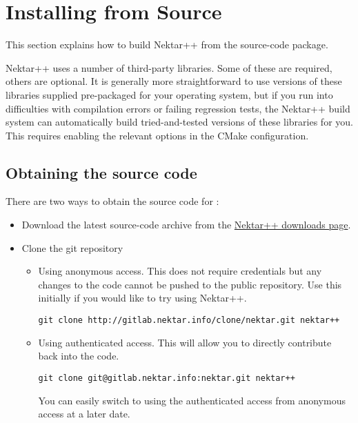 \section{Installing from Source}
\label{s:installation:source}

This section explains how to build Nektar++ from the source-code package.

Nektar++ uses a number of third-party libraries. Some of these are required,
others are optional. It is generally more straightforward to use versions of
these libraries supplied pre-packaged for your operating system, but if you run
into difficulties with compilation errors or failing regression tests, the
Nektar++ build system can automatically build tried-and-tested versions of these
libraries for you. This requires enabling the relevant options in the CMake
configuration.


\subsection{Obtaining the source code}
There are two ways to obtain the source code for \nekpp:
\begin{itemize}
	\item Download the latest source-code archive from the
	\href{http://www.nektar.info/downloads}{Nektar++ downloads page}.
	\item Clone the git repository
	\begin{itemize}
	\item Using anonymous access. This does not require
	credentials but any changes to the code cannot be pushed to the
	public repository. Use this initially if you would like to try using 
	Nektar++.
    \begin{lstlisting}[style=BashInputStyle]
        git clone http://gitlab.nektar.info/clone/nektar.git nektar++
    \end{lstlisting}
	\item Using authenticated access. This will allow you to directly contribute
	back into the code.
    \begin{lstlisting}[style=BashInputStyle]
        git clone git@gitlab.nektar.info:nektar.git nektar++
    \end{lstlisting}
    \begin{tipbox}
    You can easily switch to using the authenticated access from anonymous
    access at a later date.
    \end{tipbox}
	\end{itemize}
\end{itemize}

